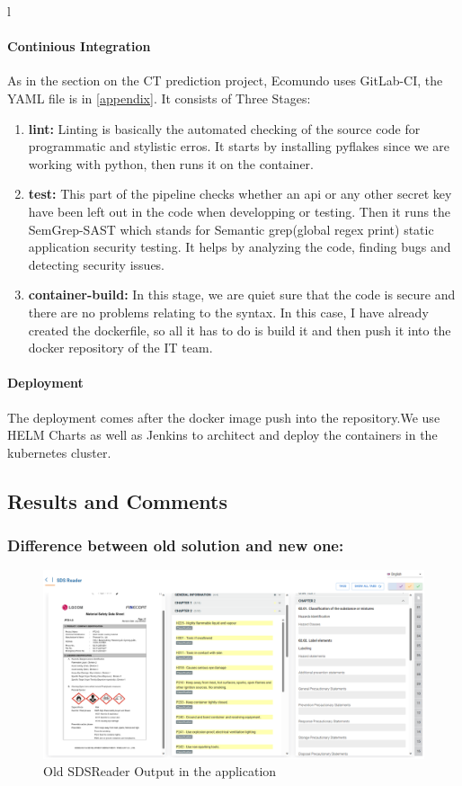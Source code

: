 l\documentclass[a4paper,12pt,twoside]{report}
\begin{document}
\paragraph{Continious Integration}
As in the section on the CT prediction project, Ecomundo uses GitLab-CI, the YAML file is in \ref{appendix}. It consists of Three Stages:
\begin{enumerate}
\item \textbf{lint:} Linting is basically the automated checking of the source code for programmatic and stylistic erros. It starts by installing pyflakes since we are working with python, then runs it on the container.
\item \textbf{test:} This part of the pipeline checks whether an api or any other secret key have been left out in the code when developping or testing. Then it runs the SemGrep-SAST which stands for Semantic grep(global regex print) static application security testing. It helps by analyzing the code, finding bugs and detecting security issues.
\item \textbf{container-build:} In this stage, we are quiet sure that the code is secure and there are no problems relating to the syntax. In this case, I have already created the dockerfile, so all it has to do is build it and then push it into the docker repository of the IT team.
\end{enumerate}

\paragraph{Deployment}
The deployment comes after the docker image push into the repository.We use HELM Charts as well as Jenkins to architect and deploy the containers in the kubernetes cluster. 
\subsection{Results and Comments}
\subsubsection{Difference between old solution and new one:}

\begin{figure}[H]
		\includegraphics[width=\textwidth, keepaspectratio ]{images/oldSDSReader}
	\caption[Old SDSReader]{Old SDSReader Output in the application}
\label{oldSDSReader}
\end{figure}
\end{document}
